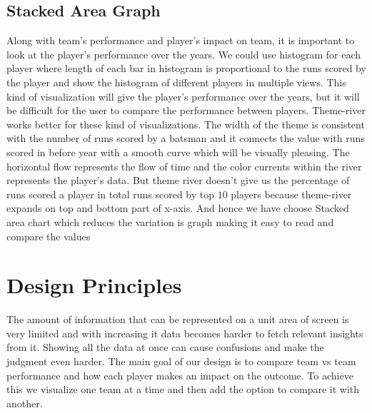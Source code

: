 \documentclass[10pt,journal,compsoc]{IEEEtran}
\begin{document}
\subsection{Stacked Area Graph}
Along with team's performance and player's impact on team, it is important to look at the player's performance over the years. We could use histogram for each player where length of each bar in histogram is proportional to the runs scored by the player and show the histogram of different players in multiple views. This kind of visualization will give the player's performance over the years, but it will be difficult for the user to compare the performance between players. Theme-river\cite{themeriver} works better for these kind of visualizations. The width of the theme is consistent with the number of runs scored by a batsman and it connects the value with runs scored in before year with a smooth curve which will be visually pleasing. The horizontal flow represents the flow of time and the color currents within the river represents the player's data. But theme river doesn't give us the percentage of runs scored a player in total runs scored by top $10$ players because theme-river expands on top and bottom part of x-axis. And hence we have choose Stacked area chart\cite{stackedgraph1} which reduces the variation is graph making it easy to read and compare the values

\section {Design Principles}
The amount of information that can be represented on a unit area of screen is very limited and with increasing it data becomes harder to fetch relevant insights from it. Showing all the data at once can cause confusions and make the judgment even harder. The main goal of our design is to compare team vs team performance and how each player makes an impact on the outcome. To achieve this we visualize one team at a time and then add the option to compare it with another.\\
\end{document}
